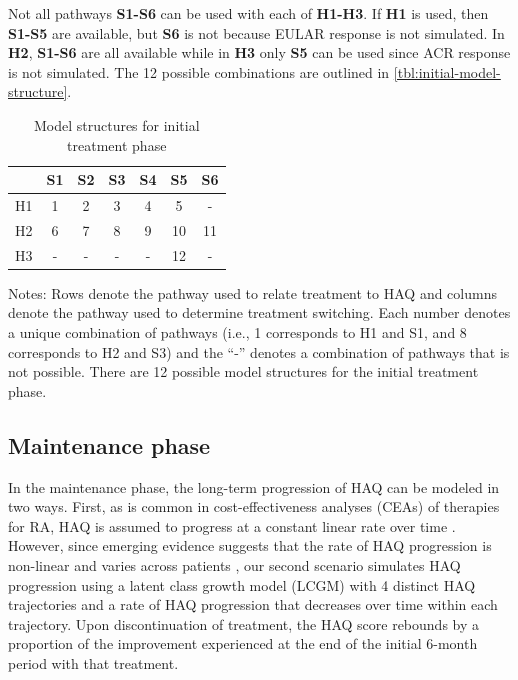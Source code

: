 \documentclass[11pt,final,fleqn]{article}\usepackage[]{graphicx}\usepackage[]{color}
\theoremstyle{plain}
\begin{document}
Not all pathways \textbf{S1-S6} can be used with each of \textbf{H1-H3}. If \textbf{H1} is used, then \textbf{S1-S5} are available, but \textbf{S6} is not because EULAR response is not simulated. In \textbf{H2}, \textbf{S1-S6} are all available while in \textbf{H3} only \textbf{S5} can be used since ACR response is not simulated. The 12 possible combinations are outlined in \autoref{tbl:initial-model-structure}.  

\begin{table}[!ht] 
\begin{center}
\begin{threeparttable}
\caption{Model structures for initial treatment phase} \label{tbl:initial-model-structure}
\begin{tabularx}{\textwidth}{@{\extracolsep{\fill}}lcccccc}
\hline
\multicolumn{1}{l}{} & \multicolumn{1}{c}{S1} & \multicolumn{1}{c}{S2} & \multicolumn{1}{c}{S3} & \multicolumn{1}{c}{S4} & \multicolumn{1}{c}{S5} & \multicolumn{1}{c}{S6}  \\
\hline
H1 & 1 & 2 & 3 & 4 & 5 & - \\
H2 & 6 & 7 & 8 & 9 & 10 & 11 \\
H3 & - & - & - & - & 12  & -\\
\hline
\end{tabularx}
\scriptsize
Notes: Rows denote the pathway used to relate treatment to HAQ and columns denote the pathway used to determine treatment switching. Each number denotes a unique combination of pathways (i.e., 1 corresponds to H1 and S1, and 8 corresponds to H2 and S3) and the ``-'' denotes a combination of pathways that is not possible. There are 12 possible model structures for the initial treatment phase. 
\end{threeparttable}
\end{center}
\end{table}

\subsection{Maintenance phase}
In the maintenance phase, the long-term progression of HAQ can be modeled in two ways. First, as is common in cost-effectiveness analyses (CEAs) of therapies for RA, HAQ is assumed to progress at a constant linear rate over time \citep[see][]{tosh2011sheffield, wailoo2008biologic}. However, since emerging evidence suggests that the rate of HAQ progression is non-linear and varies across patients \citep{gibson2016haq}, our second scenario simulates HAQ progression using a latent class growth model (LCGM) \citep{norton2014health} with 4 distinct HAQ trajectories and a rate of HAQ progression that decreases over time within each trajectory. Upon discontinuation of treatment, the HAQ score rebounds by a proportion of the improvement experienced at the end of the initial 6-month period with that treatment.
\end{document}
